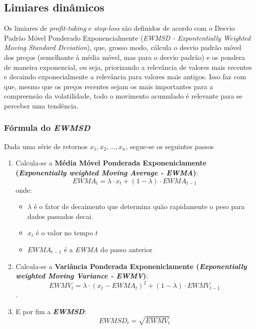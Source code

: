 \documentclass{article}
\begin{document}
\subsection{Limiares dinâmicos}

Os limiares de \textit{profit-taking} e \textit{stop-loss} são definidos de acordo com o Desvio Padrão Móvel Ponderado Exponencialmente (\textit{EWMSD - Expontentially Weighted Moving Standard Deviation}), que, grosso modo, cálcula o desvio padrão móvel dos preços (semelhante à média móvel, mas para o desvio padrão) e os pondera de maneira exponencial, ou seja, priorizando a relevância de valores mais recentes e decaindo exponecialmente a relevância para valores mais antigos. Isso faz com que, mesmo que os preços recentes sejam os mais importantes para a compreensão da volatilidade, todo o movimento acumulado é relevante para se perceber uma tendência.

\subsubsection{Fórmula do \textit{EWMSD}}
Dada uma série de retornos $x_1, x_2, \dots, x_n$, segue-se os seguintes passos

\begin{enumerate}
    \item Calcula-se a \textbf{Média Móvel Ponderada Exponeniclamente (\textit{Exponentially weighted Moving Average - EWMA})}: $$EWMA_t = \lambda \cdot x_t + (1 - \lambda) \cdot EWMA_{t - 1}$$ onde:

    \begin{itemize}
        \item $\lambda$ é o fator de decaimento que determina quão rapidamente o peso para dados passados decai.
        \item $x_t$ é o valor no tempo $t$
        \item $EWMA_{t - 1}$ é a \textit{EWMA} do passo anterior
    \end{itemize}
    
    \item Calcula-se a \textbf{Variância Ponderada Exponeniclamente (\textit{Exponentially weighted Moving Variance - EWMV})}: $$EWMV_t = \lambda \cdot (x_t - EWMA_t)^2 + (1 - \lambda) \cdot EWMV_{t - 1}$$.
    
    \item E por fim a \textbf{\textit{EWMSD}}: $$EWMSD_t = \sqrt{EWMV_t}$$
\end{enumerate}
\end{document}
